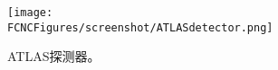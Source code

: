 \begin{figure}[H]
\centering
\texttt{[image: \\FCNCFigures/screenshot/ATLASdetector.png]}
\caption{ATLAS探测器。}
\label{fig:ATLASdetector}
\end{figure}